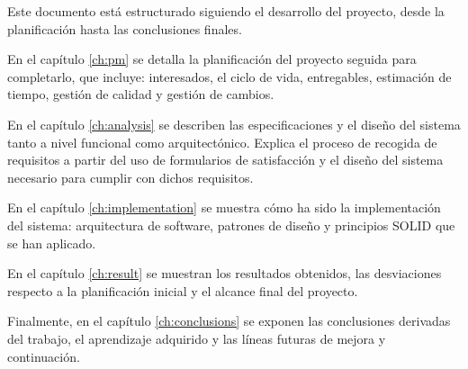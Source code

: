 Este documento está estructurado siguiendo el desarrollo del proyecto, desde la planificación hasta las conclusiones finales.

En el capítulo \ref{ch:pm} se detalla la planificación del proyecto seguida para completarlo, que incluye: interesados, el ciclo de vida, entregables, estimación de tiempo, gestión de calidad y gestión de cambios.

En el capítulo \ref{ch:analysis} se describen las especificaciones y el diseño del sistema tanto a nivel funcional como arquitectónico. Explica el proceso de recogida de requisitos a partir del uso de formularios de satisfacción y el diseño del sistema necesario para cumplir con dichos requisitos.

En el capítulo \ref{ch:implementation} se muestra cómo ha sido la implementación del sistema: arquitectura de software, patrones de diseño y principios SOLID \cite{art:solid} que se han aplicado.

En el capítulo \ref{ch:result} se muestran los resultados obtenidos, las desviaciones respecto a la planificación inicial y el alcance final del proyecto.

Finalmente, en el capítulo \ref{ch:conclusions} se exponen las conclusiones derivadas del trabajo, el aprendizaje adquirido y las líneas futuras de mejora y continuación.
